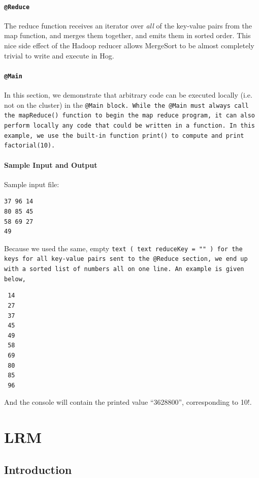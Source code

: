 \documentclass{report}
\begin{document}
\subsubsection{\tt @Reduce \rm}

The reduce function receives an iterator over \emph{all} of the key-value pairs from
the map function, and merges them together, and emits them in sorted order. This nice side effect of the Hadoop reducer allows MergeSort to be almost completely trivial to write and execute in Hog.

\subsubsection{\tt @Main \rm}

In this section, we demonstrate that arbitrary code can be executed locally (i.e.
not on the cluster) in the \tt @Main \rm block. While the \tt @Main \rm must always
call the \tt mapReduce() \rm function to begin the map reduce program, it can also
perform locally any code that could be written in a function. In this example, we
use the built-in function \tt print() \rm to compute and print \tt factorial(10).\rm

\subsubsection{Sample Input and Output}

Sample input file:

\begin{verbatim}
37 96 14 
80 85 45 
58 69 27 
49
\end{verbatim}

Because we used the same, empty \tt text \rm ( \tt text reduceKey = "" \rm) for the
keys for all key-value pairs sent to the \tt @Reduce \rm section, we end up with a
sorted list of numbers all on one line. An example is given below,

\begin{verbatim}
 14 
 27 
 37 
 45 
 49 
 58 
 69 
 80 
 85 
 96
\end{verbatim}

And the console will contain the printed value ``3628800'', corresponding to 10!.

\chapter{LRM}
\label{chap:LRM}

\section{Introduction}
\label{sec:introduction}
\end{document}
